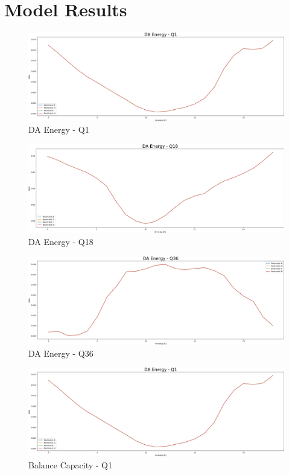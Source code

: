\section{Model Results}

\begin{figure}[H]
	\includegraphics[width=1\linewidth]{pictures/results/DA Energy - Q1.png}
	\caption{DA Energy - Q1}
	\label{fig:DA Energy - Q1}
\end{figure}

\begin{figure}[H]
	\includegraphics[width=1\linewidth]{pictures/results/DA Energy - Q18.png}
	\caption{DA Energy - Q18}
	\label{fig:DA Energy - Q18}
\end{figure}

\begin{figure}[H]
	\includegraphics[width=1\linewidth]{pictures/results/DA Energy - Q36.png}
	\caption{DA Energy - Q36}
	\label{fig:DA Energy - Q36}
\end{figure}
\begin{figure}[H]
	\includegraphics[width=1\linewidth]{pictures/results/DA Energy - Q1.png}
	\caption{Balance Capacity - Q1}
	\label{fig:Balance Capacity - Q1}
\end{figure}

